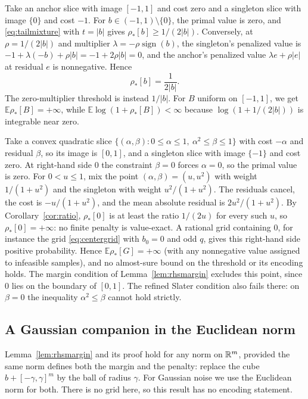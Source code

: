 \begin{example}\label{ex:infinitemean}
Take an anchor slice with image $[-1,1]$ and cost zero and a singleton
slice with image $\{0\}$ and cost $-1$. For $b\in(-1,1)\setminus\{0\}$,
the primal value is zero, and \eqref{eq:tailmixture} with $t=|b|$ gives
$\rho_*[b]\ge1/(2|b|)$. Conversely, at $\rho=1/(2|b|)$ and multiplier
$\lambda=-\rho\operatorname{sign}(b)$, the singleton's penalized value is
$-1+\lambda(-b)+\rho|b|=-1+2\rho|b|=0$, and the anchor's penalized value
$\lambda e+\rho|e|$ at residual $e$ is nonnegative. Hence
\begin{equation}\label{eq:infinitemean}
 \rho_*[b]=\frac1{2|b|}.
\end{equation}
The zero-multiplier threshold is instead $1/|b|$. For $B$ uniform on
$[-1,1]$, we get $\mathbb E\rho_*[B]=+\infty$, while
$\mathbb E\log(1+\rho_*[B])<\infty$ because $\log(1+1/(2|b|))$ is
integrable near zero.
\end{example}

\begin{example}
\label{ex:atom}
Take a convex quadratic slice
$\{(\alpha,\beta):0\le\alpha\le1,\ \alpha^2\le\beta\le1\}$ with cost
$-\alpha$ and residual $\beta$, so its image is $[0,1]$, and a singleton
slice with image $\{-1\}$ and cost zero. At right-hand side $0$ the
constraint $\beta=0$ forces $\alpha=0$, so the primal value is zero. For
$0<u\le1$, mix the point $(\alpha,\beta)=(u,u^2)$ with weight
$1/(1+u^2)$ and the singleton with weight $u^2/(1+u^2)$. The residuals
cancel, the cost is $-u/(1+u^2)$, and the mean absolute residual is
$2u^2/(1+u^2)$. By Corollary~\ref{cor:ratio}, $\rho_*[0]$ is at least the
ratio $1/(2u)$ for every such $u$, so $\rho_*[0]=+\infty$: no finite
penalty is value-exact. A rational grid containing $0$, for instance the
grid \eqref{eq:centergrid} with $b_0=0$ and odd $q$, gives this
right-hand side positive probability. Hence $\mathbb E\rho_*[G]=+\infty$
(with any nonnegative value assigned to infeasible samples), and no
almost-sure bound on the threshold or its encoding holds. The margin
condition of Lemma~\ref{lem:rhsmargin} excludes this point, since $0$
lies on the boundary of $[0,1]$. The refined Slater condition also fails
there: on $\beta=0$ the inequality $\alpha^2\le\beta$ cannot hold strictly.
\end{example}

\subsection{A Gaussian companion in the Euclidean norm}\label{sec:gaussian}
Lemma~\ref{lem:rhsmargin} and its proof hold for any norm on $\mathbb R^m$,
provided the same norm defines both the margin and the penalty: replace
the cube $b+[-\gamma,\gamma]^m$ by the ball of radius $\gamma$. For
Gaussian noise we use the Euclidean norm for both. There is no grid
here, so this result has no encoding statement.

